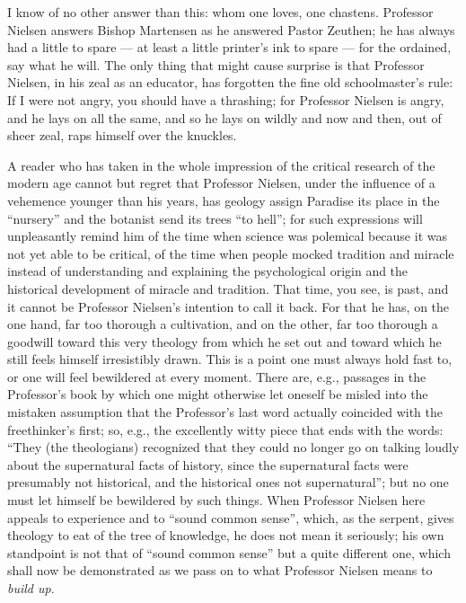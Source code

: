 \documentclass[12pt,a4paper,openany]{book}
\newcommand{\opage}[1]{\marginnote{\footnotesize\textit{[#1]}}}
\begin{document}
I know of no other answer than this: whom one loves, one chastens.
Professor Nielsen answers Bishop Martensen as he answered Pastor
Zeuthen; he has always had a little to spare --- at least a little
printer's ink to spare --- for the ordained, say what he will. %
The only thing that might cause surprise is that Professor Nielsen, in
his zeal as an educator, has forgotten the fine old schoolmaster's
rule: If I were not angry, you should have a thrashing; for Professor
Nielsen is angry, and he lays on all the same, and so he lays on
wildly and now and then, out of sheer zeal, raps himself over the
knuckles.

A reader who has taken in the whole impression of the critical
research of the modern age cannot but regret that Professor Nielsen,
under the influence of a vehemence younger than his years, has geology
assign Paradise its place in the ``nursery'' and the botanist send its
trees ``to hell''; for such expressions will unpleasantly remind him
of the time when science was polemical because it was not yet able to
be critical, of the time when people mocked tradition and miracle
instead of understanding and explaining the psychological origin and
the historical development of miracle and tradition. That time, you
see, is past, and it cannot be Professor Nielsen's intention to call it
back. For that he has, on the one hand, far too thorough a cultivation,
and on the other, far too thorough a goodwill toward this very
theology from which he set out and toward which he still feels himself
irresistibly drawn. This is a point one must always hold fast to, or
one will feel bewildered at every moment. There are, e.g., passages in
the Professor's book by which one might otherwise
\opage{87}let oneself be misled into the mistaken assumption that the
Professor's last word actually coincided with the freethinker's first;
so, e.g., the excellently witty piece that ends with the words: ``They
(the theologians) recognized that they could no longer go on talking
loudly about the supernatural facts of history, since the supernatural
facts were presumably not historical, and the historical ones not
supernatural''; but no one must let himself be bewildered by such
things. When Professor Nielsen here appeals to experience and to
``sound common sense'', which, as the serpent, gives theology to eat of
the tree of knowledge, he does not mean it seriously; his own
standpoint is not that of ``sound common sense'' but a quite different
one, which shall now be demonstrated as we pass on to what Professor
Nielsen means to \emph{build up}.
\end{document}
